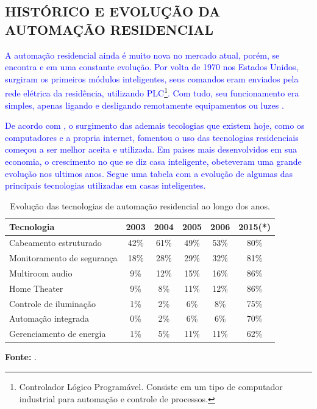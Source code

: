     

    \subsection{HISTÓRICO E EVOLUÇÃO DA AUTOMAÇÃO RESIDENCIAL}
        \textcolor{blue}{A automação residencial ainda é muito nova no mercado atual, porém, se encontra e em uma constante evolução. Por volta de 1970 nos Estados Unidos, surgiram os primeiros módulos inteligentes, seus comandos eram enviados pela rede elétrica da residência, utilizando PLC\footnote{Controlador Lógico Programável. Consiste em um tipo de computador industrial para automação e controle de processos.}. Com tudo, seu funcionamento era simples, apenas ligando e desligando remotamente equipamentos ou luzes \cite{automacaoResidencialCap1}.}

        \textcolor{blue}{De acordo com \cite{automacaoResidencialCap1}, o surgimento das ademais tecologias que existem hoje, como os computadores e a propria internet, fomentou o uso das tecnologias residenciais começou a ser melhor aceita e utilizada. Em paises mais desenvolvidos em sua economia, o crescimento no que se diz casa inteligente, obeteveram uma grande evolução nos ultimos anos. Segue uma tabela com a evolução de algumas das principais tecnologias utilizadas em casas inteligentes.}

        \begin{table}[H]
            \centering
            \renewcommand{\arraystretch}{1.3}
            \setlength{\tabcolsep}{10pt}
            \begin{tabular}{lccccc}
            \hline
            \textbf{Tecnologia} & \textbf{2003} & \textbf{2004} & \textbf{2005} & \textbf{2006} & \textbf{2015(*)} \\
            \hline
            Cabeamento estruturado & 42\% & 61\% & 49\% & 53\% & 80\% \\
            Monitoramento de segurança & 18\% & 28\% & 29\% & 32\% & 81\% \\
            Multiroom audio & 9\% & 12\% & 15\% & 16\% & 86\% \\
            Home Theater & 9\% & 8\% & 11\% & 12\% & 86\% \\
            Controle de iluminação & 1\% & 2\% & 6\% & 8\% & 75\% \\
            Automação integrada & 0\% & 2\% & 6\% & 6\% & 70\% \\
            Gerenciamento de energia & 1\% & 5\% & 11\% & 11\% & 62\% \\
            \hline
            \end{tabular}
            \caption{Evolução das tecnologias de automação residencial ao longo dos anos.}
            \label{tab:tecnologias-automacao}

            \vspace{0.5em}
            \small
            \textbf{Fonte:} \cite{automacaoResidencialCap1}.\\
        \end{table}


